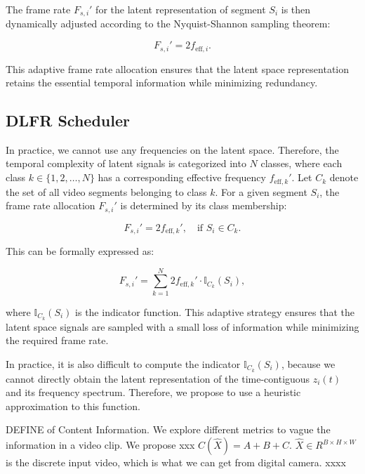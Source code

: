 The frame rate \( F_{s,i}' \) for the latent representation of segment \( S_i \) is then dynamically adjusted according to the Nyquist-Shannon sampling theorem:

\[
F_{s,i}' = 2 f_{\text{eff}, i}.
\]

This adaptive frame rate allocation ensures that the latent space representation retains the essential temporal information while minimizing redundancy.

\subsection{DLFR Scheduler}

In practice, we cannot use any frequencies on the latent space. Therefore, the temporal complexity of latent signals is categorized into \( N \) classes, where each class \( k \in \{1, 2, \dots, N\} \) has a corresponding effective frequency \( f_{\text{eff},k}' \). Let \( C_k \) denote the set of all video segments belonging to class \( k \). For a given segment \( S_i \), the frame rate allocation \( F_{s,i}' \) is determined by its class membership:

\[
F_{s,i}' = 2 f_{\text{eff},k}', \quad \text{if } S_i \in C_k.
\]

This can be formally expressed as:

\[
F_{s,i}' = \sum_{k=1}^{N} 2 f_{\text{eff},k}' \cdot \mathbb{I}_{C_k}(S_i),
\]

where \( \mathbb{I}_{C_k}(S_i) \) is the indicator function. This adaptive strategy ensures that the latent space signals are sampled with a small loss of information while minimizing the required frame rate.

In practice, it is also difficult to compute the indicator \( \mathbb{I}_{C_k}(S_i) \), because we cannot directly obtain the latent representation of the time-contiguous \( z_i(t) \) and its frequency spectrum.
Therefore, we propose to use a heuristic approximation to this function. 

DEFINE of Content Information. We explore different metrics to vague the information in a video clip. We propose xxx $C(\hat{X})=A+B+C$. $\hat{X}\in R^{B \times H\times W}$ is the discrete input video, which is what we can get from digital camera. xxxx 






